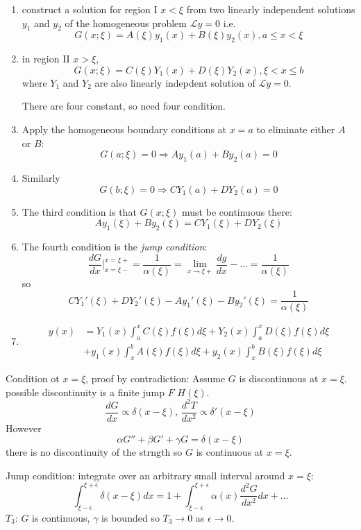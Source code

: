 \documentclass[a4paper]{article}
\renewcommand*{\L}{\mathcal{L}}
\begin{document}
\begin{enumerate}
\item construct a solution for region I \(x < \xi\) from two linearly independent solutions \(y_1\) and \(y_2\) of the homogeneous problem \(\L y = 0\) i.e.
  \[
    G(x; \xi) = A(\xi)y_1(x) + B(\xi)y_2(x), a \leq x < \xi
  \]
\item in region II \(x > \xi\),
  \[
    G(x; \xi) = C(\xi)Y_1(x) + D(\xi)Y_2(x), \xi < x \leq b
  \]
  where \(Y_1\) and \(Y_2\) are also linearly indepdent solution of \(\L y = 0\).

  There are four constant, so need four condition.
\item Apply the homogeneous boundary conditions at \(x = a\) to eliminate either \(A\) or \(B\):
  \[
    G(a; \xi) = 0 \Rightarrow Ay_1(a) + By_2(a) = 0
  \]
\item Similarly
  \[
    G(b; \xi) = 0 \Rightarrow CY_1(a) + DY_2(a) = 0
  \]
\item The third condition is that \(G(x; \xi)\) must be continuous there:
  \[
    Ay_1(\xi) + By_2(\xi) = CY_1(\xi) + DY_2(\xi)
  \]
\item The fourth condition is the \emph{jump condition}:
  \[
    \frac{dG}{dx} \Big|_{x = \xi-}^{x = \xi+} = \frac{1}{\alpha(\xi)} = \lim_{x \to \xi+} \frac{dg}{dx} - \dots = \frac{1}{\alpha(\xi)}
  \]
  so
  \[
    CY_1'(\xi) + DY_2'(\xi) - Ay_1'(\xi) - By_2'(\xi) = \frac{1}{\alpha(\xi)}
  \]
\item
  \begin{align*}
    y(x) &= Y_1(x) \int_{a}^{x} C(\xi)f(\xi) d\xi + Y_2(x) \int_{a}^{x} D(\xi)f(\xi) d\xi \\
    &+ y_1(x) \int_{x}^{b} A(\xi)f(\xi) d\xi + y_2(x) \int_{x}^{b} B(\xi)f(\xi) d\xi
  \end{align*}
\end{enumerate}

Condition ot \(x = \xi\), proof by contradiction:
Assume \(G\) is discontinuous at \(x = \xi\). possible discontinuity is a finite jump \(F\) \(H(\xi)\).
\[
  \frac{dG}{dx} \propto \delta(x - \xi), \, \frac{d^2T}{dx^2} \propto \delta'(x - \xi)
\]
However
\[
  \alpha G'' + \beta G' + \gamma G = \delta(x - \xi)
\]
there is no discontinuity of the strngth so \(G\) is continuous at \(x = \xi\).

Jump condition: integrate over an arbitrary small interval around \(x = \xi\):
\[
  \int_{\xi - \epsilon}^{\xi + \epsilon} \delta(x - \xi) dx = 1 + \int_{\xi -\epsilon}^{\xi + \epsilon} \alpha(x) \frac{d^2G}{dx^2} dx + \dots
\]
\(T_3\): \(G\) is continuous, \(\gamma\) is bounded so \(T_3 \to 0\) as \(\epsilon \to 0\).
\end{document}
